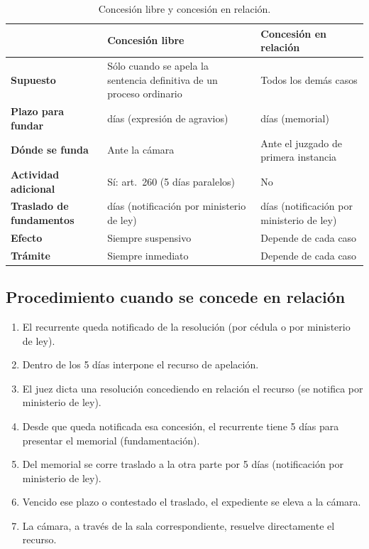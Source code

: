 \documentclass[12pt,oneside]{book}
\begin{document}
\begin{table}[H]
\centering
\begin{tabularx}{\textwidth}{
    >{\raggedright\arraybackslash}p{}
    >{\raggedright\arraybackslash}X
    >{\raggedright\arraybackslash}X
}
\toprule
 & \textbf{Concesi\'on libre} & \textbf{Concesi\'on en relaci\'on} \\
\midrule
\textbf{Supuesto} & S\'olo cuando se apela la sentencia definitiva de un proceso ordinario & Todos los dem\'as casos \\
\addlinespace
\textbf{Plazo para fundar} & 10 d\'ias (expresi\'on de agravios) & 5 d\'ias (memorial) \\
\addlinespace
\textbf{D\'onde se funda} & Ante la c\'amara & Ante el juzgado de primera instancia \\
\addlinespace
\textbf{Actividad adicional} & S\'i: art.~260 (5 d\'ias paralelos) & No \\
\addlinespace
\textbf{Traslado de fundamentos} & 10 d\'ias (notificaci\'on por ministerio de ley) & 5 d\'ias (notificaci\'on por ministerio de ley) \\
\addlinespace
\textbf{Efecto} & Siempre suspensivo & Depende de cada caso \\
\addlinespace
\textbf{Tr\'amite} & Siempre inmediato & Depende de cada caso \\
\bottomrule
\end{tabularx}
\caption{Concesi\'on libre y concesi\'on en relaci\'on.}
\end{table}

\subsection{Procedimiento cuando se concede en relaci\'on}

\begin{enumerate}
    \item El recurrente queda notificado de la resoluci\'on (por c\'edula o por ministerio de ley).
    \item Dentro de los 5 d\'ias interpone el recurso de apelaci\'on.
    \item El juez dicta una resoluci\'on concediendo en relaci\'on el recurso (se notifica por ministerio de ley).
    \item Desde que queda notificada esa concesi\'on, el recurrente tiene 5 d\'ias para presentar el memorial (fundamentaci\'on).
    \item Del memorial se corre traslado a la otra parte por 5 d\'ias (notificaci\'on por ministerio de ley).
    \item Vencido ese plazo o contestado el traslado, el expediente se eleva a la c\'amara.
    \item La c\'amara, a trav\'es de la sala correspondiente, resuelve directamente el recurso.
\end{enumerate}
\end{document}
